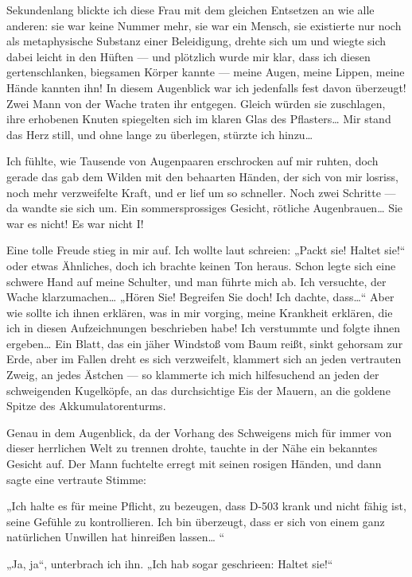 Sekundenlang blickte ich diese Frau mit dem gleichen Entsetzen an
wie alle anderen: sie war keine Nummer mehr, sie war ein Mensch,
sie existierte nur noch als metaphysische Substanz einer
Beleidigung, drehte sich um und wiegte sich dabei leicht in den
Hüften — und plötzlich wurde mir klar, dass ich diesen
gertenschlanken, biegsamen Körper kannte — meine Augen, meine
Lippen, meine Hände kannten ihn! In diesem Augenblick war
ich jedenfalls fest davon überzeugt! Zwei Mann von der Wache traten
ihr entgegen. Gleich würden sie zuschlagen, ihre erhobenen Knuten
spiegelten sich im klaren Glas des Pflasters\ldots{} Mir stand das Herz
still, und ohne lange zu überlegen, stürzte ich hinzu\ldots{}

Ich fühlte, wie Tausende von Augenpaaren erschrocken auf mir
ruhten, doch gerade das gab dem Wilden mit den behaarten Händen,
der sich von mir losriss, noch mehr verzweifelte Kraft, und er lief
um so schneller. Noch zwei Schritte — da wandte sie sich um. Ein
sommersprossiges Gesicht, rötliche Augenbrauen\ldots{} Sie war es nicht!
Es war nicht I!

Eine tolle Freude stieg in mir auf. Ich wollte laut schreien:
„Packt sie! Haltet sie!“ oder etwas Ähnliches, doch ich brachte
keinen Ton heraus. Schon legte sich eine schwere Hand auf meine
Schulter, und man führte mich ab. Ich versuchte, der Wache
klarzumachen\ldots{} „Hören Sie! Begreifen Sie doch! Ich dachte,
dass\ldots{}“ Aber wie sollte ich ihnen erklären, was in mir vorging,
meine Krankheit erklären, die ich in diesen Aufzeichnungen
beschrieben habe! Ich verstummte und folgte ihnen ergeben\ldots{} Ein
Blatt, das ein jäher Windstoß vom Baum reißt, sinkt gehorsam zur
Erde, aber im Fallen dreht es sich verzweifelt, klammert sich an
jeden vertrauten Zweig, an jedes Ästchen — so klammerte ich mich
hilfesuchend an jeden der schweigenden Kugelköpfe, an das
durchsichtige Eis der Mauern, an die goldene Spitze des
Akkumulatorenturms.

Genau in dem Augenblick, da der Vorhang des Schweigens mich für
immer von dieser herrlichen Welt zu trennen drohte, tauchte in der
Nähe ein bekanntes Gesicht auf. Der Mann fuchtelte erregt mit
seinen rosigen Händen, und dann sagte eine vertraute Stimme:

„Ich halte es für meine Pflicht, zu bezeugen, dass D-503 krank und
nicht fähig ist, seine Gefühle zu kontrollieren. Ich bin überzeugt,
dass er sich von einem ganz natürlichen Unwillen hat hinreißen
lassen\ldots{} “

„Ja, ja“, unterbrach ich ihn. „Ich hab sogar geschrieen: Haltet
sie!“


